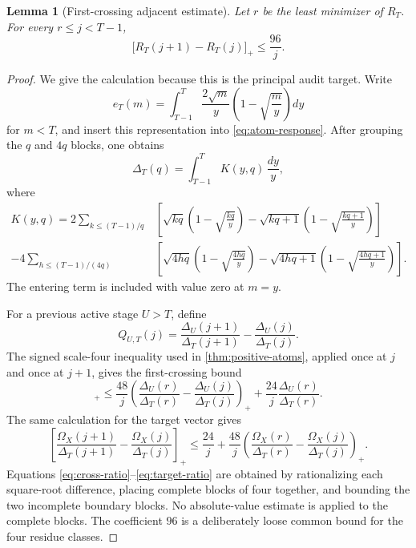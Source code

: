 \documentclass[11pt]{article}
\newtheorem{lemma}[theorem]{Lemma}
\newcommand{\Om}{\Omega}
\begin{document}
\begin{lemma}[First-crossing adjacent estimate]\label{lem:first-crossing}
Let $r$ be the least minimizer of $R_T$. For every $r\le j<T-1$,
\begin{equation}
 \bigl[R_T(j+1)-R_T(j)\bigr]_+
 \le \frac{96}{j}.
 \label{eq:first-crossing}
\end{equation}
\end{lemma}

\begin{proof}
We give the calculation because this is the principal audit target. Write
\[
 e_T(m)=\int_{T-1}^T \frac{2\sqrt m}{y}\left(1-\sqrt{\frac my}\right)dy
\]
for $m<T$, and insert this representation into \eqref{eq:atom-response}. After grouping the $q$ and $4q$ blocks, one obtains
\begin{equation}
 \Delta_T(q)=\int_{T-1}^T K(y,q)\,\frac{dy}{y},
 \label{eq:kernel-integral}
\end{equation}
where
\begin{align}
 K(y,q)=2\sum_{k\le (T-1)/q}
 &\left[\sqrt{kq}\left(1-\sqrt{\frac{kq}{y}}\right)
 -\sqrt{kq+1}\left(1-\sqrt{\frac{kq+1}{y}}\right)\right]\nonumber\\
 -4\sum_{h\le (T-1)/(4q)}
 &\left[\sqrt{4hq}\left(1-\sqrt{\frac{4hq}{y}}\right)
 -\sqrt{4hq+1}\left(1-\sqrt{\frac{4hq+1}{y}}\right)\right].
 \label{eq:kernel}
\end{align}
The entering term is included with value zero at $m=y$.

For a previous active stage $U>T$, define
\[
 Q_{U,T}(j)=\frac{\Delta_U(j+1)}{\Delta_T(j+1)}-\frac{\Delta_U(j)}{\Delta_T(j)}.
\]
The signed scale-four inequality used in \cref{thm:positive-atoms}, applied once at $j$ and once at $j+1$, gives the first-crossing bound
\begin{equation}
 [Q_{U,T}(j)]_+\le\frac{48}{j}\left(
 \frac{\Delta_U(r)}{\Delta_T(r)}-\frac{\Delta_U(j)}{\Delta_T(j)}
 \right)_+ +\frac{24}{j}\frac{\Delta_U(r)}{\Delta_T(r)}.
 \label{eq:cross-ratio}
\end{equation}
The same calculation for the target vector gives
\begin{equation}
 \left[\frac{\Om_X(j+1)}{\Delta_T(j+1)}-\frac{\Om_X(j)}{\Delta_T(j)}\right]_+
 \le\frac{24}{j}+\frac{48}{j}
 \left(\frac{\Om_X(r)}{\Delta_T(r)}-\frac{\Om_X(j)}{\Delta_T(j)}\right)_+.
 \label{eq:target-ratio}
\end{equation}
Equations \eqref{eq:cross-ratio}--\eqref{eq:target-ratio} are obtained by rationalizing each square-root difference, placing complete blocks of four together, and bounding the two incomplete boundary blocks. No absolute-value estimate is applied to the complete blocks. The coefficient $96$ is a deliberately loose common bound for the four residue classes.


\end{proof}
\end{document}
